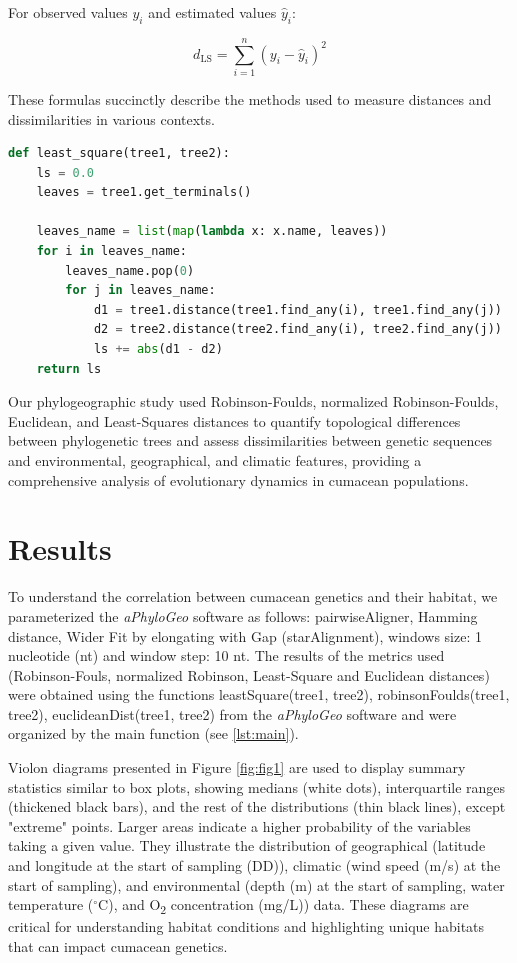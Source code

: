 For observed values $y_i$ and estimated values $\hat{y}_i$:

\begin{equation}\label{eq:ls}
    d_{\text{LS}} = \sum_{i=1}^{n} (y_i - \hat{y}_i)^2
\end{equation}

These formulas succinctly describe the methods used to measure distances and dissimilarities in various contexts.

\begin{lstlisting}[label=lst:LeastSquare, language=Python, caption=Python script for calculating the Least-Square distance using the ete3 package in the aPhyloGeo package]
def least_square(tree1, tree2):
    ls = 0.0
    leaves = tree1.get_terminals()

    leaves_name = list(map(lambda x: x.name, leaves))
    for i in leaves_name:
        leaves_name.pop(0)
        for j in leaves_name:
            d1 = tree1.distance(tree1.find_any(i), tree1.find_any(j))
            d2 = tree2.distance(tree2.find_any(i), tree2.find_any(j))
            ls += abs(d1 - d2)
    return ls
\end{lstlisting}

Our phylogeographic study used Robinson-Foulds, normalized Robinson-Foulds, Euclidean, and Least-Squares distances to quantify topological differences between phylogenetic trees and assess dissimilarities between genetic sequences and environmental, geographical, and climatic features, providing a comprehensive analysis of evolutionary dynamics in cumacean populations.

\section{Results}\label{results}

To understand the correlation between cumacean genetics and their habitat, we parameterized the \textit{aPhyloGeo} software as follows: pairwiseAligner, Hamming distance, Wider Fit by elongating with Gap (starAlignment), windows size: 1 nucleotide (nt) and window step: 10 nt. The results of the metrics used (Robinson-Fouls, normalized Robinson, Least-Square and Euclidean distances) were obtained using the functions leastSquare(tree1, tree2), robinsonFoulds(tree1, tree2), euclideanDist(tree1, tree2) from the \textit{aPhyloGeo} software and were organized by the main function (see \autoref{lst:main}). 

Violon diagrams presented in Figure \ref{fig:fig1} are used to display summary statistics similar to box plots, showing medians (white dots), interquartile ranges (thickened black bars), and the rest of the distributions (thin black lines), except "extreme" points. Larger areas indicate a higher probability of the variables taking a given value. They illustrate the distribution of geographical (latitude and longitude at the start of sampling (DD)), climatic (wind speed (m/s) at the start of sampling), and environmental (depth (m) at the start of sampling, water temperature ($^\circ$C), and O\textsubscript{2} concentration (mg/L)) data. These diagrams are critical for understanding habitat conditions and highlighting unique habitats that can impact cumacean genetics. 

